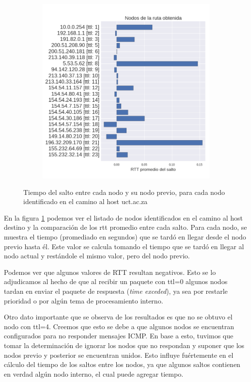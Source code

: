 \begin{figure}[ht]
  \begin{subfigure}[b]{.5\textwidth}
    \hspace*{-1.5cm}
    \includegraphics[width=1.2\textwidth]{Imagenes/capetown_rtts.png}
  \end{subfigure}
  \label{fig:capetown_rtts}
  \caption{Tiempo del salto entre cada nodo y su nodo previo, para cada nodo identificado en el camino al host uct.ac.za}
\end{figure}

\par En la figura \ref{fig:capetown_rtts} podemos ver el listado de nodos identificados en el camino al host destino y la comparación de los rtt promedio entre cada salto. Para cada nodo, se muestra el tiempo (promediado en segundos) que se tardó en llegar desde el nodo previo hasta él. Este valor se calcula tomando el tiempo que se tardó en llegar al nodo actual y restándole el mismo valor, pero del nodo previo.
\par Podemos ver que algunos valores de RTT resultan negativos. Esto se lo adjudicamos al hecho de que al recibir un paquete con ttl=0 algunos nodos tardan en enviar el paquete de respuesta (\textit{time exceded}), ya sea por restarle prioridad o por algún tema de procesamiento interno.
\par Otro dato importante que se observa de los resultados es que no se obtuvo el nodo con ttl=4. Creemos que esto se debe a que algunos nodos se encuentran configurados para no responder mensajes ICMP. En base a esto, tuvimos que tomar la determinación de ignorar los nodos que no respondan y suponer que los nodos previo y posterior se encuentran unidos. Esto influye fuértemente en el cálculo del tiempo de los saltos entre los nodos, ya que algunos saltos contienen en verdad algún nodo interno, el cual puede agregar tiempo.

